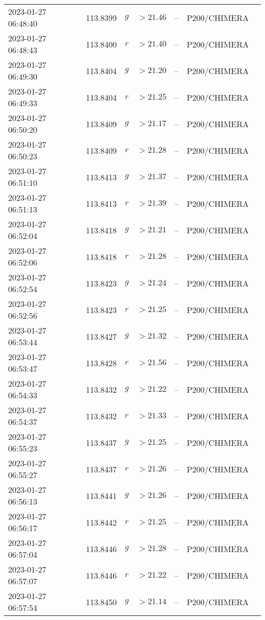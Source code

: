 \documentclass{nature_plusfigure}
\begin{document}
\begin{supplement}
\begin{center}
\begin{longtable}{lllllll}
2023-01-27 06:48:40 & 113.8399 & $g$ & $>21.46$ & -- & P200/CHIMERA &  \\ 
2023-01-27 06:48:43 & 113.8400 & $r$ & $>21.40$ & -- & P200/CHIMERA &  \\ 
2023-01-27 06:49:30 & 113.8404 & $g$ & $>21.20$ & -- & P200/CHIMERA &  \\ 
2023-01-27 06:49:33 & 113.8404 & $r$ & $>21.25$ & -- & P200/CHIMERA &  \\ 
2023-01-27 06:50:20 & 113.8409 & $g$ & $>21.17$ & -- & P200/CHIMERA &  \\ 
2023-01-27 06:50:23 & 113.8409 & $r$ & $>21.28$ & -- & P200/CHIMERA &  \\ 
2023-01-27 06:51:10 & 113.8413 & $g$ & $>21.37$ & -- & P200/CHIMERA &  \\ 
2023-01-27 06:51:13 & 113.8413 & $r$ & $>21.39$ & -- & P200/CHIMERA &  \\ 
2023-01-27 06:52:04 & 113.8418 & $g$ & $>21.21$ & -- & P200/CHIMERA &  \\ 
2023-01-27 06:52:06 & 113.8418 & $r$ & $>21.28$ & -- & P200/CHIMERA &  \\ 
2023-01-27 06:52:54 & 113.8423 & $g$ & $>21.24$ & -- & P200/CHIMERA &  \\ 
2023-01-27 06:52:56 & 113.8423 & $r$ & $>21.25$ & -- & P200/CHIMERA &  \\ 
2023-01-27 06:53:44 & 113.8427 & $g$ & $>21.32$ & -- & P200/CHIMERA &  \\ 
2023-01-27 06:53:47 & 113.8428 & $r$ & $>21.56$ & -- & P200/CHIMERA &  \\ 
2023-01-27 06:54:33 & 113.8432 & $g$ & $>21.22$ & -- & P200/CHIMERA &  \\ 
2023-01-27 06:54:37 & 113.8432 & $r$ & $>21.33$ & -- & P200/CHIMERA &  \\ 
2023-01-27 06:55:23 & 113.8437 & $g$ & $>21.25$ & -- & P200/CHIMERA &  \\ 
2023-01-27 06:55:27 & 113.8437 & $r$ & $>21.26$ & -- & P200/CHIMERA &  \\ 
2023-01-27 06:56:13 & 113.8441 & $g$ & $>21.26$ & -- & P200/CHIMERA &  \\ 
2023-01-27 06:56:17 & 113.8442 & $r$ & $>21.25$ & -- & P200/CHIMERA &  \\ 
2023-01-27 06:57:04 & 113.8446 & $g$ & $>21.28$ & -- & P200/CHIMERA &  \\ 
2023-01-27 06:57:07 & 113.8446 & $r$ & $>21.22$ & -- & P200/CHIMERA &  \\ 
2023-01-27 06:57:54 & 113.8450 & $g$ & $>21.14$ & -- & P200/CHIMERA &  \\ 

\end{longtable}
\end{center}
\end{supplement}
\end{document}
